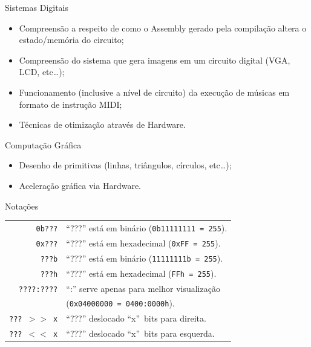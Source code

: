 \documentclass{beamer}
\begin{document}
\begin{darkframes}
\begin{frame}{Sistemas Digitais}
    \begin{itemize}
        \item Compreensão a respeito de como o Assembly gerado pela
            compilação altera o estado/memória do circuito;
        \item Compreensão do sistema que gera imagens em um circuito
            digital (VGA, LCD, etc\ldots);
        \item Funcionamento (inclusive a nível de circuito) da execução de
            músicas em formato de instrução MIDI\@;
        \item Técnicas de otimização através de Hardware.
    \end{itemize}
\end{frame}

\begin{frame}{Computação Gráfica}
    \begin{itemize}
        \item Desenho de primitivas (linhas, triângulos, círculos, etc\ldots);
        \item Aceleração gráfica via Hardware.
    \end{itemize}
\end{frame}

\begin{frame}{Notações}
    \begin{center}
        \begin{tabular}{r|l}
            \texttt{0b???}      & \enquote{???} está em binário (\texttt{0b11111111 = 255}).\\
            \texttt{0x???}      & \enquote{???} está em hexadecimal (\texttt{0xFF = 255}).\\
            \texttt{???b}       & \enquote{???} está em binário (\texttt{11111111b = 255}).\\
            \texttt{???h}       & \enquote{???} está em hexadecimal (\texttt{FFh = 255}).\\
            \texttt{????:????}  & \enquote{:} serve apenas para melhor visualização \\
                                & (\texttt{0x04000000 = 0400:0000h}).\\
            \texttt{??? $>>$ x} & \enquote{???} deslocado ``x''\ bits para direita.\\
            \texttt{??? $<<$ x} & \enquote{???} deslocado ``x''\ bits para esquerda.\\
        \end{tabular}
    \end{center}
\end{frame}



\end{darkframes}
\end{document}

